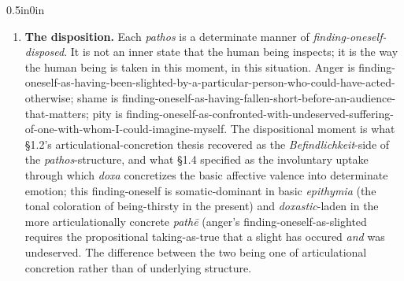 \documentclass{article}
\begin{document}
\begin{adjustwidth}{0.5in}{0in}
    \begin{enumerate}
        \item \textbf{The disposition.} Each \textit{pathos} is a determinate manner of \textit{finding-oneself-disposed}. It is not an inner state that the human being inspects; it is the way the human being is taken in this moment, in this situation. Anger is finding-oneself-as-having-been-slighted-by-a-particular-person-who-could-have-acted-otherwise; shame is finding-oneself-as-having-fallen-short-before-an-audience-that-matters; pity is finding-oneself-as-confronted-with-undeserved-suffering-of-one-with-whom-I-could-imagine-myself. The dispositional moment is what \S1.2's articulational-concretion thesis recovered as the \textit{Befindlichkeit}-side of the \textit{pathos}-structure, and what \S1.4 specified as the involuntary uptake through which \textit{doxa} concretizes the basic affective valence into determinate emotion; this finding-oneself is somatic-dominant in basic \textit{epithymia} (the tonal coloration of being-thirsty in the present) and \textit{doxastic}-laden in the more articulationally concrete \textit{pathē} (anger's finding-oneself-as-slighted requires the propositional taking-as-true that a slight has occured \textit{and} was undeserved. The difference between the two being one of articulational concretion rather than of underlying structure.
        

\end{enumerate}
\end{adjustwidth}
\end{document}
